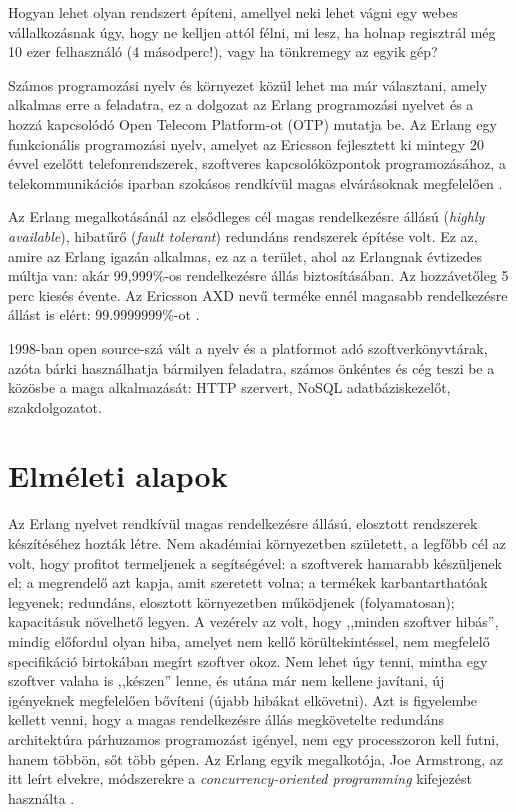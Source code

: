 \documentclass[12pt, a4paper, oneside]{book}
\begin{document}
Hogyan lehet olyan rendszert építeni, amellyel neki lehet vágni egy webes
vállalkozásnak úgy, hogy ne kelljen attól félni, mi lesz, ha holnap regisztrál
még 10 ezer felhasználó (4 másodperc!), vagy ha tönkremegy az egyik gép?

Számos programozási nyelv és környezet közül lehet ma már választani, amely
alkalmas erre a feladatra, ez a dolgozat az Erlang programozási nyelvet és a
hozzá kapcsolódó Open Telecom Platform-ot (OTP) mutatja be. Az Erlang egy
funkcionális programozási nyelv, amelyet az Ericsson fejlesztett ki mintegy 20
évvel ezelőtt telefonrendszerek, szoftveres kapcsolóközpontok programozásához,
a telekommunikációs iparban szokásos rendkívül magas elvárásoknak megfelelően
\citep{ArmstrongBook}. 

Az Erlang megalkotásánál az elsődleges cél magas rendelkezésre állású
(\emph{highly available}), hibatűrő (\emph{fault tolerant}) redundáns
rendszerek építése volt. Ez az, amire az Erlang igazán alkalmas, ez az a
terület, ahol az Erlangnak évtizedes múltja van: akár 99,999\%-os
rendelkezésre állás biztosításában. Az hozzávetőleg 5 perc kiesés
évente. Az Ericsson AXD nevű terméke ennél magasabb rendelkezésre állást is
elért: 99.9999999\%-ot \citep{CesariniBook}.

1998-ban open source-szá vált a nyelv és a platformot adó
szoftverkönyvtárak, azóta bárki használhatja bármilyen feladatra, számos
önkéntes és cég teszi be a közösbe a maga alkalmazását: HTTP szervert, NoSQL
adatbáziskezelőt, szakdolgozatot.

\newpage

\chapter{Elméleti alapok} 

Az Erlang nyelvet rendkívül magas rendelkezésre állású, elosztott rendszerek
készítéséhez hozták létre. Nem akadémiai környezetben született, a legfőbb cél
az volt, hogy profitot termeljenek a segítségével: a szoftverek hamarabb
készüljenek el; a megrendelő azt kapja, amit szeretett volna; a termékek
karbantarthatóak legyenek; redundáns, elosztott környezetben működjenek
(folyamatosan); kapacitásuk növelhető legyen. A vezérelv az volt, hogy ,,minden
szoftver hibás'', mindig előfordul olyan hiba, amelyet nem kellő
körültekintéssel, nem megfelelő specifikáció birtokában megírt szoftver okoz.
Nem lehet úgy tenni, mintha egy szoftver valaha is ,,készen'' lenne, és utána már
nem kellene javítani, új igényeknek megfelelően bővíteni (újabb hibákat
elkövetni). Azt is figyelembe kellett venni, hogy a magas
rendelkezésre állás megkövetelte redundáns architektúra párhuzamos programozást
igényel, nem egy processzoron kell futni, hanem többön, sőt több gépen. Az
Erlang egyik megalkotója, Joe Armstrong, az itt leírt elvekre, módszerekre a
\emph{concurrency-oriented programming} kifejezést használta
\citep{ArmstrongBook}.
\end{document}
